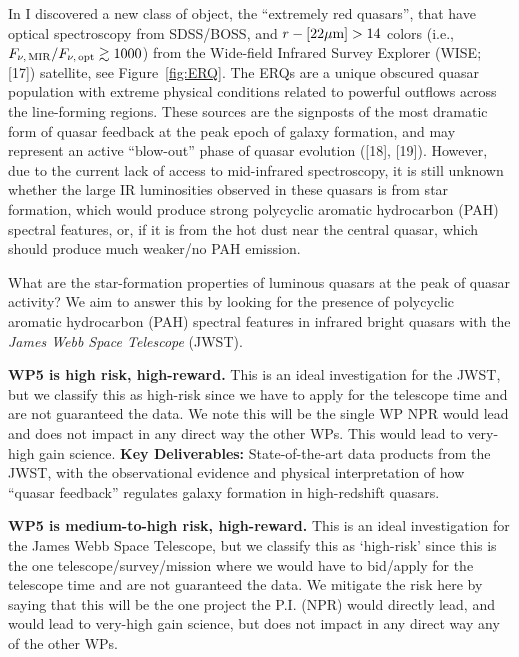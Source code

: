 \smallskip
\smallskip
\noindent
In \citet{Ross2015} I discovered a new class of object, the ``extremely red
quasars'', that have optical spectroscopy from SDSS/BOSS, and
$r-[22\mu{\rm m}]>14$ colors (i.e., $F_{\nu,\, {\rm MIR}} / F_{\nu,\,
{\rm opt}} \gtrsim 1000$) from the Wide-field Infrared Survey Explorer
(WISE; [17]) satellite, see Figure~\ref{fig:ERQ}.  The ERQs are a
unique obscured quasar population with extreme physical conditions
related to powerful outflows across the line-forming regions. These
sources are the signposts of the most dramatic form of quasar feedback
at the peak epoch of galaxy formation, and may represent an active
``blow-out'' phase of quasar evolution ([18], [19]).  However, due to
the current lack of access to mid-infrared spectroscopy, it is still
unknown whether the large IR luminosities observed in these quasars is
from star formation, which would produce strong polycyclic aromatic
hydrocarbon (PAH) spectral features, or, if it is from the hot dust
near the central quasar, which should produce much weaker/no PAH
emission.

\smallskip
\smallskip
\noindent
What are the star-formation properties of luminous quasars at the peak
of quasar activity?  We aim to answer this by looking for the presence
of polycyclic aromatic hydrocarbon (PAH) spectral features in infrared
bright quasars with the {\it James Webb Space Telescope} (JWST).  

\smallskip
\smallskip
\noindent
{\bf WP5 is high risk, high-reward.}  This is an ideal investigation for
the JWST, but we classify this as high-risk since we have to apply for
the telescope time and are not guaranteed the data.  We note this will
be the single WP NPR would lead and does not impact in any direct way
the other WPs. This would lead to very-high gain science.  {\bf Key
Deliverables:} State-of-the-art data products from the JWST, with the
observational evidence and physical interpretation of how ``quasar
feedback'' regulates galaxy formation in high-redshift quasars.

\smallskip
\smallskip
\noindent
{\bf WP5 is medium-to-high risk, high-reward.}
This is an ideal investigation for the James Webb Space Telescope, but we classify this as `high-risk' since this is the one telescope/survey/mission where we would have to bid/apply for the telescope time and are not guaranteed the data. We mitigate the risk here by saying that this will be the one project the P.I. (NPR) would directly lead, and would lead to very-high gain science, but does not impact in any direct way any of the other WPs. 



